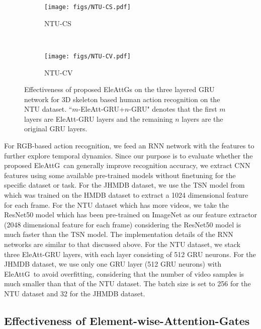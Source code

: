 \documentclass[runningheads]{llncs}
\newcommand{\Outer}{Element-wise}
\newcommand{\EleAttGn}{{EleAttG}}
\newcommand{\EleAttG}{{EleAttG~}}
\begin{document}
\begin{figure}[t] \setlength{\belowcaptionskip}{-10pt}
	\centering
	\begin{subfigure}[t]{0.45\linewidth}
		\centering\texttt{[image: figs/NTU-CS.pdf]}
		\caption{NTU-CS}
		\label{subfig:CS}
	\end{subfigure}	
	~~
	\begin{subfigure}[t]{0.45\linewidth}
		\centering\texttt{[image: figs/NTU-CV.pdf]}
		\caption{NTU-CV}			
		\label{subfig:CV}
	\end{subfigure}
\caption{Effectiveness of proposed {\EleAttGn}s on the three layered GRU network for 3D skeleton based human action recognition on the NTU dataset. ``$m$-EleAtt-GRU+$n$-GRU" denotes that the first $m$ layers are EleAtt-GRU layers and the remaining $n$ layers are the original GRU layers.}\label{fig:layer}
\end{figure}


For RGB-based action recognition, we feed an RNN network with the features to further explore temporal dynamics. Since our purpose is to evaluate whether the proposed \EleAttG can generally improve recognition accuracy, we extract CNN features using some available pre-trained models without finetuning for the specific dataset or task. For the JHMDB dataset, we use the TSN model from \cite{wang2016temporal,TSNModel} which was trained on the HMDB dataset \cite{kuehne2011hmdb} to extract a 1024 dimensional feature for each frame. For the NTU dataset which has more videos, we take the ResNet50 model \cite{he2016deep,ResNet50Model} which has been pre-trained on ImageNet as our feature extractor (2048 dimensional feature for each frame) considering the ResNet50 model is much faster than the TSN model. The implementation details of the RNN networks are similar to that discussed above. For the NTU dataset, we stack three EleAtt-GRU layers, with each layer consisting of 512 GRU neurons. For the JHMDB dataset, we use only one GRU layer (512 GRU neurons) with \EleAttG to avoid overfitting, considering that the number of video samples is much smaller than that of the NTU dataset. The batch size is set to 256 for the NTU dataset and 32 for the JHMDB dataset.


\subsection{Effectiveness of \Outer-Attention-Gates} 
\end{document}
